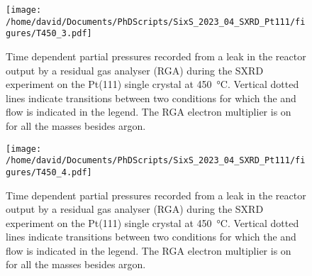 \begin{figure}[!htb]
    \centering
    \texttt{[image: /home/david/Documents/PhDScripts/SixS\_2023\_04\_SXRD\_Pt111/figures/T450\_3.pdf]}
    \caption{
        Time dependent partial pressures recorded from a leak in the reactor output by a residual gas analyser (RGA) during the SXRD experiment on the Pt(111) single crystal at \qty{450}{\degreeCelsius}.
        Vertical dotted lines indicate transitions between two conditions for which the  and  flow is indicated in the legend.
        The RGA electron multiplier is on for all the masses besides argon.
    }
    \label{fig:RGA450Pt111_3}
\end{figure}

\begin{figure}[!htb]
    \centering
    \texttt{[image: /home/david/Documents/PhDScripts/SixS\_2023\_04\_SXRD\_Pt111/figures/T450\_4.pdf]}
    \caption{
        Time dependent partial pressures recorded from a leak in the reactor output by a residual gas analyser (RGA) during the SXRD experiment on the Pt(111) single crystal at \qty{450}{\degreeCelsius}.
        Vertical dotted lines indicate transitions between two conditions for which the  and  flow is indicated in the legend.
        The RGA electron multiplier is on for all the masses besides argon.
    }
    \label{fig:RGA450Pt111_4}
\end{figure}